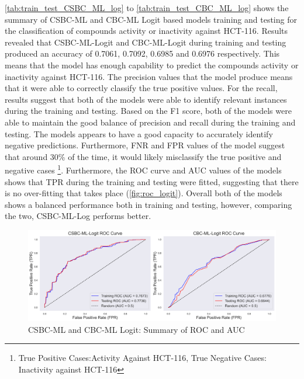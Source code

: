 \autoref{tab:train_test_CSBC_ML_log} to \ref{tab:train_test_CBC_ML_log} shows the summary of CSBC-ML and CBC-ML Logit based models training and testing for the classification of compounds activity or inactivity against HCT-116. Results revealed that CSBC-ML-Logit and CBC-ML-Logit during training and testing produced an accuracy of 0.7061, 0.7092, 0.6985 and 0.6976 respectively. This means that the model has enough capability to predict the compounds activity or inactivity against HCT-116. The precision values that the model produce means that it were able to correctly classify the true positive values. For the recall, results suggest that both of the models were able to identify relevant instances during the training and testing. Based on the F1 score, both of the models were able to maintain the good balance of precision and recall during the training and testing. The models appears to have a good capacity to accurately identify negative predictions. Furthermore, FNR and FPR values of the model suggest that around 30\% of the time, it would likely misclassify the true positive and negative cases \footnote{True Positive Cases:Activity Against HCT-116, True Negative Cases: Inactivity against HCT-116}. Furthermore, the ROC curve and AUC values of the models shows that TPR during the training and testing were fitted, suggesting that there is no over-fitting that takes place (\autoref{fig:roc_logit}). Overall both of the models shows a balanced performance both in training and testing, however, comparing the two, CSBC-ML-Log performs better. 
  
\begin{figure}[h] %
    \centering
    \includegraphics[scale=0.4]{combined_roc_logit.png} %
    \caption{CSBC-ML and CBC-ML Logit: Summary of ROC and AUC}
    \label{fig:roc_logit} %
\end{figure}   
  
